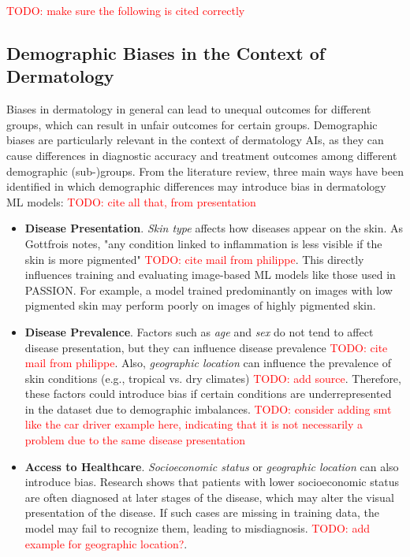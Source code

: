 \documentclass[12pt, a4paper, oneside]{book}   	%
\renewcommand{\todo}[1]{\textcolor{red}{TODO: #1}}
\begin{document}
		  	\todo{make sure the following is cited correctly}
			
			\subsection{Demographic Biases in the Context of Dermatology} \label{chap:demographicBiasesDermatology}
			Biases in dermatology in general can lead to unequal outcomes for different groups, which can result in unfair outcomes for certain groups. Demographic biases are particularly relevant in the context of dermatology \glspl{AI}, as they can cause differences in diagnostic accuracy and treatment outcomes among different demographic (sub-)groups.
			From the literature review, three main ways have been identified in which demographic differences may introduce bias in dermatology \gls{ML} models:
			\todo{cite all that, from presentation}
			
			\begin{itemize}
				\item \textbf{Disease Presentation}. \textit{Skin type} affects how diseases appear on the skin. As Gottfrois notes, "any condition linked to inflammation is less visible if the skin is more pigmented" \todo{cite mail from philippe}. This directly influences training and evaluating image-based \gls{ML} models like those used in PASSION. For example, a model trained predominantly on images with low pigmented skin may perform poorly on images of highly pigmented skin.
				
				\item \textbf{Disease Prevalence}. Factors such as \textit{age} and \textit{sex} do not tend to affect disease presentation, but they can influence disease prevalence \todo{cite mail from philippe}. Also, \textit{geographic location} can influence the prevalence of skin conditions (e.g., tropical vs. dry climates) \todo{add source}. Therefore, these factors could introduce bias if certain conditions are underrepresented in the dataset due to demographic imbalances. \todo{consider adding smt like the car driver example here, indicating that it is not necessarily a problem due to the same disease presentation}
				
				\item \textbf{Access to Healthcare}. \textit{Socioeconomic status} or \textit{geographic location} can also introduce bias. Research shows that patients with lower socioeconomic status are often diagnosed at later stages of the disease, which may alter the visual presentation of the disease. If such cases are missing in training data, the model may fail to recognize them, leading to misdiagnosis. \todo{add example for geographic location?}.
			\end{itemize}
			
\end{document}
